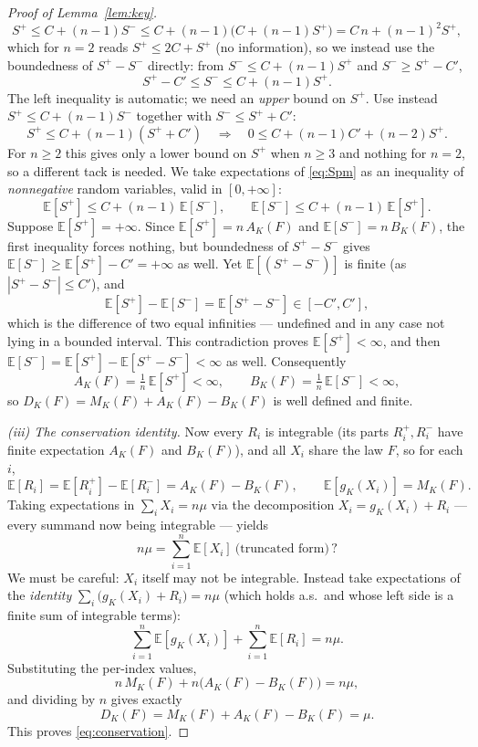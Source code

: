 \documentclass{amsart}
\theoremstyle{definition}
\theoremstyle{remark}
\begin{document}
\begin{proof}[Proof of Lemma~\ref{lem:key}]
\[
S^+\le C+(n-1)S^-\le C+(n-1)\bigl(C+(n-1)S^+\bigr)=C\,n+(n-1)^2 S^+ ,
\]
which for $n=2$ reads $S^+\le 2C+S^+$ (no information), so we instead use the boundedness of
$S^+-S^-$ directly: from $S^-\le C+(n-1)S^+$ and $S^-\ge S^+-C'$,
\[
S^+-C'\le S^-\le C+(n-1)S^+ .
\]
The left inequality is automatic; we need an \emph{upper} bound on $S^+$. Use instead
$S^+\le C+(n-1)S^-$ together with $S^-\le S^++C'$:
\[
S^+\le C+(n-1)(S^++C') \quad\Longrightarrow\quad 0\le C+(n-1)C'+(n-2)S^+ .
\]
For $n\ge 2$ this gives only a lower bound on $S^+$ when $n\ge3$ and nothing for $n=2$,
so a different tack is needed. We take expectations of \eqref{eq:Spm} as an inequality of
\emph{nonnegative} random variables, valid in $[0,+\infty]$:
\[
\mathbb{E}[S^+]\le C+(n-1)\,\mathbb{E}[S^-],\qquad
\mathbb{E}[S^-]\le C+(n-1)\,\mathbb{E}[S^+].
\]
Suppose $\mathbb{E}[S^+]=+\infty$. Since $\mathbb{E}[S^+]=n\,A_K(F)$ and
$\mathbb{E}[S^-]=n\,B_K(F)$, the first inequality forces nothing, but boundedness of
$S^+-S^-$ gives $\mathbb{E}[S^-]\ge \mathbb{E}[S^+]-C'=+\infty$ as well. Yet
$\mathbb{E}[(S^+-S^-)]$ is finite (as $|S^+-S^-|\le C'$), and
\[
\mathbb{E}[S^+]-\mathbb{E}[S^-]=\mathbb{E}[S^+-S^-]\in[-C',C'] ,
\]
which is the difference of two equal infinities — undefined and in any case not lying in a
bounded interval. This contradiction proves $\mathbb{E}[S^+]<\infty$, and then
$\mathbb{E}[S^-]=\mathbb{E}[S^+]-\mathbb{E}[S^+-S^-]<\infty$ as well. Consequently
\[
A_K(F)=\tfrac1n\,\mathbb{E}[S^+]<\infty,\qquad B_K(F)=\tfrac1n\,\mathbb{E}[S^-]<\infty,
\]
so $D_K(F)=M_K(F)+A_K(F)-B_K(F)$ is well defined and finite.

\emph{(iii) The conservation identity.}
Now every $R_i$ is integrable (its parts $R_i^+,R_i^-$ have finite expectation $A_K(F)$ and
$B_K(F)$), and all $X_i$ share the law $F$, so for each $i$,
\[
\mathbb{E}[R_i]=\mathbb{E}[R_i^+]-\mathbb{E}[R_i^-]=A_K(F)-B_K(F),
\qquad
\mathbb{E}[g_K(X_i)]=M_K(F).
\]
Taking expectations in $\sum_i X_i=n\mu$ via the decomposition $X_i=g_K(X_i)+R_i$ — every
summand now being integrable — yields
\[
n\mu=\sum_{i=1}^n\mathbb{E}[X_i]\ \text{(truncated form)}\,?
\]
We must be careful: $X_i$ itself may not be integrable. Instead take expectations of the
\emph{identity} $\sum_i\bigl(g_K(X_i)+R_i\bigr)=n\mu$ (which holds a.s.\ and whose left side
is a finite sum of integrable terms):
\[
\sum_{i=1}^n\mathbb{E}[g_K(X_i)]+\sum_{i=1}^n\mathbb{E}[R_i]=n\mu .
\]
Substituting the per-index values,
\[
n\,M_K(F)+n\bigl(A_K(F)-B_K(F)\bigr)=n\mu ,
\]
and dividing by $n$ gives exactly
\[
D_K(F)=M_K(F)+A_K(F)-B_K(F)=\mu .
\]
This proves \eqref{eq:conservation}.
\end{proof}
\end{document}
